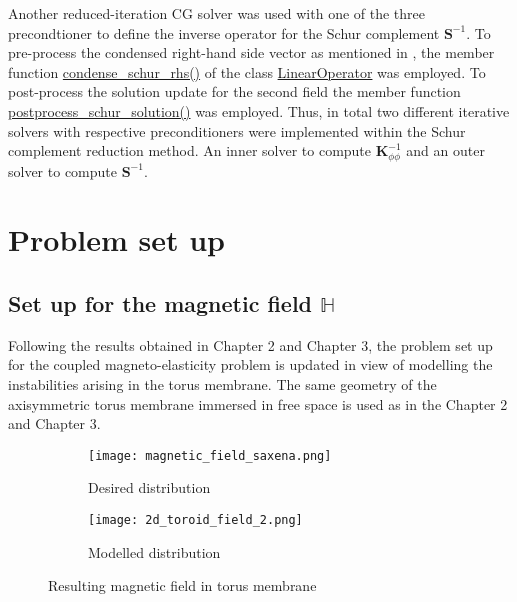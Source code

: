 Another reduced-iteration CG solver was used with one of the three precondtioner to define the inverse operator for the Schur complement $\mathbf{S}^{-1}$. To pre-process the condensed right-hand side vector as mentioned in , the member function \href{https://www.dealii.org/current/doxygen/deal.II/group__LAOperators.html#ga2c071b6555ac9e2eb543b7da5100889b}{condense\_schur_rhs()} of the class \href{https://www.dealii.org/current/doxygen/deal.II/classLinearOperator.html}{LinearOperator} was employed. To post-process the solution update for the second field the member function \href{https://www.dealii.org/current/doxygen/deal.II/group__LAOperators.html#gab965c40b54990bbcbc129a1cd218ee21}{postprocess\_schur_solution()} was employed. Thus, in total two different iterative solvers with respective preconditioners were implemented within the Schur complement reduction method. An inner solver to compute $\mathbf{K}_{\phi \phi}^{-1}$ and an outer solver to compute $\mathbf{S}^{-1}$.

\section{Problem set up}
\label{sec:problem_setup}

\subsection{Set up for the magnetic field $\mathbb{H}$}
Following the results obtained in Chapter 2 and Chapter 3, the problem set up for the coupled magneto-elasticity problem is updated in view of modelling the instabilities arising in the torus membrane. The same geometry of the axisymmetric torus membrane immersed in free space is used as in the Chapter 2 and Chapter 3.  \par 

\begin{figure}[h]
\centering
\begin{subfigure}{0.59\textwidth}
\centering
\texttt{[image: magnetic\_field\_saxena.png]}
\caption{Desired distribution \cite{reddy_toroid}}
\label{fig:3.3.1}
\end{subfigure}
\begin{subfigure}{0.39\textwidth}
\centering
\texttt{[image: 2d\_toroid\_field\_2.png]}
\caption{Modelled distribution}
\label{fig:3.3.2}
\end{subfigure}
\caption{Resulting magnetic field in torus membrane}
\label{fig:3.3}
\end{figure}

